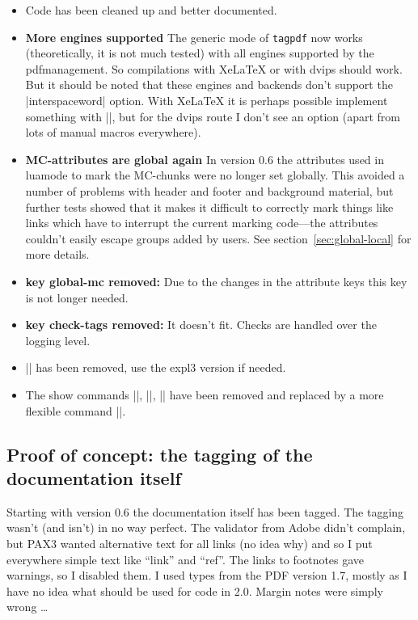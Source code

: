 \documentclass[DIV=12,parskip=half-,bibliography=totoc]{scrartcl}
\newcommand\pkg[1]{\texttt{#1}}
\newcommand\PDF{PDF}
\begin{document}
\begin{itemize}
\item Code has been cleaned up and better documented.

\item \textbf{More engines supported} The generic mode of \pkg{tagpdf} now works
(theoretically, it is not much tested) with all engines supported
by the pdfmanagement. So compilations with Xe\LaTeX{} or with dvips should work. But it should be noted that
these engines and backends don't support the |interspaceword| option. With Xe\LaTeX{} it is perhaps possible
implement something with |\XeTeXinterchartoks|, but for the dvips route I don't see an option (apart from lots
of manual macros everywhere).
\item \textbf{MC-attributes are global again} In version 0.6 the attributes used in
luamode to mark the MC-chunks were no longer set globally. This avoided a number of problems with header and footer
and background material, but further tests showed that it makes it difficult to correctly mark things like
links which have to interrupt the current marking code---the attributes couldn't easily escape groups added by
users. See section~\ref{sec:global-local} for more details.
\item \textbf{key global-mc removed:} Due to the changes in the attribute keys this key is not longer needed.
\item \textbf{key check-tags removed:} It doesn't fit. Checks are handled over the logging level.
\item |\tagpdfget| has been removed, use the expl3 version if needed.
\item The show commands |\showtagpdfmcdata|, |\showtagpdfattributes|, |\showtagstack| have been removed and replaced
by a more flexible command |\ShowTagging|.
\end{itemize}


\subsection{Proof of concept: the tagging of the documentation itself}

Starting with version 0.6 the documentation itself has been tagged. The tagging wasn't (and isn't) in no way perfect. The validator from Adobe didn't complain, but PAX3 wanted alternative text for all links (no idea why) and so I put everywhere simple text like \enquote{link} and \enquote{ref}. The links to footnotes gave warnings, so I disabled them. I used types from the \PDF{} version 1.7, mostly as I have no idea what should be used for code in 2.0. Margin notes were simply wrong \ldots
\end{document}
